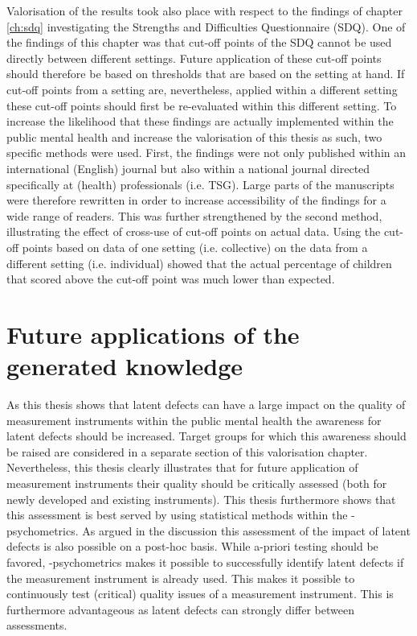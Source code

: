 Valorisation of the results took also place with respect to the findings of chapter \ref{ch:sdq} investigating the Strengths and Difficulties Questionnaire (SDQ). One of the findings of this chapter was that cut-off points of the SDQ cannot be used directly between different settings. Future application of these cut-off points should therefore be based on thresholds that are based on the setting at hand. If cut-off points from a setting are, nevertheless, applied within a different setting these cut-off points should first be re-evaluated within this different setting. To increase the likelihood that these findings are actually implemented within the public mental health and increase the valorisation of this thesis as such, two specific methods were used. First, the findings were not only published within an international (English) journal but also within a national journal directed specifically at (health) professionals (i.e. TSG). Large parts of the manuscripts were therefore rewritten in order to increase accessibility of the findings for a wide range of readers. This was further strengthened by the second method, illustrating the effect of cross-use of cut-off points on actual data. Using the cut-off points based on data of one setting (i.e. collective) on the data from a different setting (i.e. individual) showed that the actual percentage of children that scored above the cut-off point was much lower than expected.

\section*{Future applications of the generated knowledge}
As this thesis shows that latent defects can have a large impact on the quality of measurement instruments within the public mental health the awareness for latent defects should be increased. Target groups for which this awareness should be raised are considered in a separate section of this valorisation chapter. Nevertheless, this thesis clearly illustrates that for future application of measurement instruments their quality should be critically assessed (both for newly developed and existing instruments). This thesis furthermore shows that this assessment is best served by using statistical methods within the \textbeta-psychometrics. As argued in the discussion this assessment of the impact of latent defects is also possible on a post-hoc basis. While a-priori testing should be favored, \textbeta-psychometrics makes it possible to successfully identify latent defects if the measurement instrument is already used. This makes it possible to continuously test (critical) quality issues of a measurement instrument. This is furthermore advantageous as latent defects can strongly differ between assessments. 


